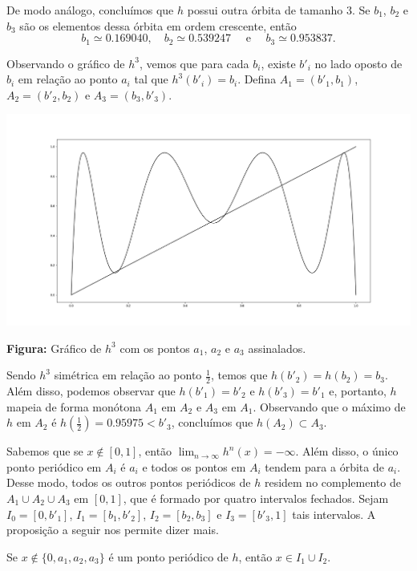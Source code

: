 De modo análogo, concluímos que $h$ possui outra órbita de tamanho $3$. Se $b_1$, $b_2$ e $b_3$ são os elementos dessa órbita em ordem crescente, então
$$b_1 \simeq 0.169040, \quad b_2 \simeq 0.539247 \quad  \text{ e } \quad b_3 \simeq 0.953837.$$

Observando o gráfico de $h^3$, vemos que para cada $b_i$, existe $b'_i$ no lado oposto de $b_i$ em relação ao ponto $a_i$ tal que $h^3(b'_i) = b_i$. Defina $A_1 = (b'_1, b_1)$, $A_2 = (b'_2, b_2)$ e $A_3 = (b_3, b'_3)$.

\begin{center}
\includegraphics[scale=0.3]{images/h_3,839.png}

{\small \textbf{Figura:} Gráfico de $h^3$ com os pontos $a_1$, $a_2$ e $a_3$ assinalados.}
\end{center}

Sendo $h^3$ simétrica em relação ao ponto $\frac{1}{2}$, temos que $h(b'_2) = h(b_2) = b_3$.
Além disso, podemos observar que $h(b'_1) = b'_2$ e $h(b'_3) = b'_1$ e, portanto, $h$ mapeia de forma monótona $A_1$ em $A_2$ e $A_3$ em $A_1$. Observando que o máximo de $h$ em $A_2$ é $h( \frac{1}{2}) = 0.95975 < b'_3$, concluímos que $h(A_2) \subset A_3$.

Sabemos que se $x \notin [0, 1]$, então $\lim_{n \to \infty} h^n(x) = -\infty$.
Além disso, o único ponto periódico em $A_i$ é $a_i$ e todos os pontos em $A_i$ tendem para a órbita de $a_i$.
Desse modo, todos os outros pontos periódicos de $h$ residem no complemento de $A_1 \cup A_2 \cup A_3$ em $[0, 1]$, que é formado por quatro intervalos fechados. Sejam $I_0 = [0, b'_1]$, $I_1 = [b_1, b'_2]$, $I_2 = [b_2, b_3]$ e $I_3 = [b'_3, 1]$ tais intervalos. A proposição a seguir nos permite dizer mais.

\begin{proposition}
Se $x \notin \lbrace 0, a_1, a_2, a_3 \rbrace$ é um ponto periódico de $h$, então $x \in I_1 \cup I_2$.
\end{proposition}

